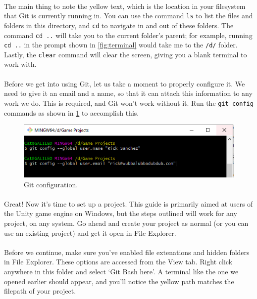 \documentclass{article}
\begin{document}
\paragraph{}
The main thing to note the yellow text, which is the location in your filesystem that Git is currently running in. You can use the command \texttt{ls} to list the files and folders in this directory, and \texttt{cd} to navigate in and out of these folders. The command \texttt{cd ..} will take you to the current folder's parent; for example, running \texttt{cd ..} in the prompt shown in \ref{fig:terminal} would take me to the \texttt{/d/} folder. Lastly, the \texttt{clear} command will clear the screen, giving you a blank terminal to work with.

\paragraph{}
Before we get into using Git, let us take a moment to properly configure it. We need to give it an email and a name, so that it can attach this information to any work we do. This is required, and Git won't work without it. Run the \texttt{git config} commands as shown in \ref{fig:config} to accomplish this.

\begin{figure}
    \includegraphics[width=\linewidth]{images/config.png}
    \caption{Git configuration.}
    \label{fig:config}
\end{figure}

\paragraph{}
Great! Now it's time to set up a project. This guide is primarily aimed at users of the Unity game engine on Windows, but the steps outlined will work for any project, on any system. Go ahead and create your project as normal (or you can use an existing project) and get it open in File Explorer.

\paragraph{}
Before we continue, make sure you've enabled file extenations and hidden folders in File Explorer. These options are accessed from the View tab. Right click anywhere in this folder and select `Git Bash here'. A terminal like the one we opened earlier should appear, and you'll notice the yellow path matches the filepath of your project.
\end{document}
